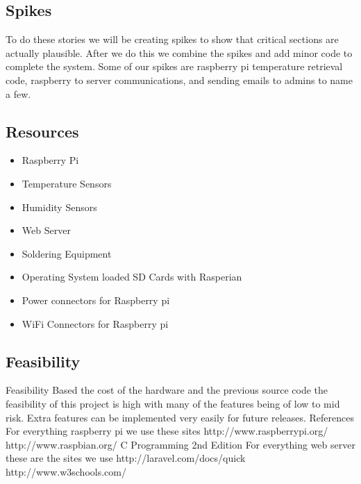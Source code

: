 \documentclass{report}
\begin{document}
\subsection*{Spikes}
	To do these stories we will be creating spikes to show that critical sections are actually plausible. After we do this we combine the spikes and add minor code to complete the system. Some of our spikes are raspberry pi temperature retrieval code, raspberry to server communications, and sending emails to admins to name a few. 
\newpage
\subsection*{Resources}
\begin{itemize}
\item Raspberry Pi
\item Temperature Sensors
\item Humidity Sensors
\item Web Server
\item Soldering Equipment
\item Operating System loaded SD Cards with Rasperian
\item Power connectors for Raspberry pi
\item WiFi Connectors for Raspberry pi
\end{itemize}
\newpage
\subsection*{Feasibility}
Feasibility
	Based the cost of the hardware and the previous source code the feasibility of this project is high with many of the features being of low to mid risk. Extra features can be implemented very easily for future releases.
References
	For everything raspberry pi we use these sites
http://www.raspberrypi.org/
http://www.raspbian.org/
C Programming 2nd Edition
For everything web server these are the sites we use
	http://laravel.com/docs/quick
http://www.w3schools.com/
\newpage
\end{document}
